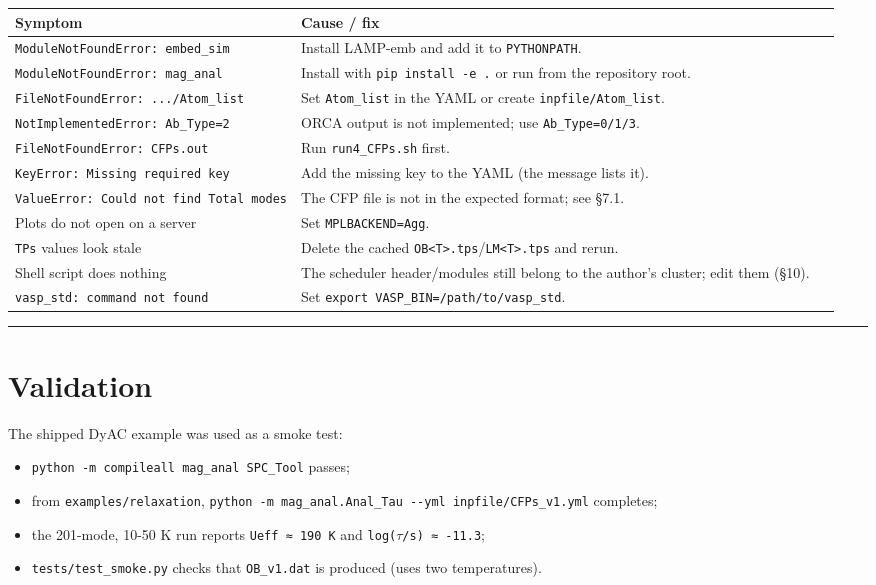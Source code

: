 \documentclass[11pt,a4paper]{article}
\providecommand{\tightlist}{%
  \setlength{\itemsep}{0pt}\setlength{\parskip}{0pt}}
\begin{document}
\begin{longtable}[]{@{}>{\raggedright\arraybackslash}p{0.30\linewidth} >{\raggedright\arraybackslash}p{0.66\linewidth}@{}}
\toprule
Symptom\strut
 & Cause / fix\strut
\tabularnewline
\midrule
\endhead
\texttt{ModuleNotFoundError:\ embed\_sim}\strut
 & Install LAMP-emb and add it to \texttt{PYTHONPATH}.\strut
\tabularnewline
\texttt{ModuleNotFoundError:\ mag\_anal}\strut
 & Install with \texttt{pip\ install\ -e\ .} or run from the repository
root.\strut
\tabularnewline
\texttt{FileNotFoundError:\ .../Atom\_list}\strut
 & Set \texttt{Atom\_list} in the YAML or create
\texttt{inpfile/Atom\_list}.\strut
\tabularnewline
\texttt{NotImplementedError:\ Ab\_Type=2}\strut
 & ORCA output is not implemented; use \texttt{Ab\_Type=0/1/3}.\strut
\tabularnewline
\texttt{FileNotFoundError:\ CFPs.out}\strut
 & Run \texttt{run4\_CFPs.sh} first.\strut
\tabularnewline
\texttt{KeyError:\ Missing\ required\ key}\strut
 & Add the missing key to the YAML (the message lists it).\strut
\tabularnewline
\texttt{ValueError:\ Could\ not\ find\ \textquotesingle{}Total\ modes\textquotesingle{}}\strut
 & The CFP file is not in the expected format; see \S7.1.\strut
\tabularnewline
Plots do not open on a server\strut
 & Set \texttt{MPLBACKEND=Agg}.\strut
\tabularnewline
\texttt{TPs} values look stale\strut
 & Delete the cached
\texttt{OB\textless{}T\textgreater{}.tps}/\texttt{LM\textless{}T\textgreater{}.tps}
and rerun.\strut
\tabularnewline
Shell script does nothing\strut
 & The scheduler header/modules still belong to the author's cluster; edit
them (\S10).\strut
\tabularnewline
\texttt{vasp\_std:\ command\ not\ found}\strut
 & Set \texttt{export\ VASP\_BIN=/path/to/vasp\_std}.\strut
\tabularnewline
\bottomrule
\end{longtable}

\begin{center}\rule{0.5\linewidth}{0.4pt}\end{center}

\section{Validation}\label{validation}

The shipped DyAC example was used as a smoke test:

\begin{itemize}
\tightlist
\item
  \texttt{python\ -m\ compileall\ mag\_anal\ SPC\_Tool} passes;
\item
  from \texttt{examples/relaxation},
  \texttt{python\ -m\ mag\_anal.Anal\_Tau\ -\/-yml\ inpfile/CFPs\_v1.yml}
  completes;
\item
  the 201-mode, 10-50 K run reports \texttt{Ueff\ ≈\ 190\ K} and
  \texttt{log(\(\tau\)/s)\ ≈\ -11.3};
\item
  \texttt{tests/test\_smoke.py} checks that \texttt{OB\_v1.dat} is
  produced (uses two temperatures).
\end{itemize}
\end{document}
